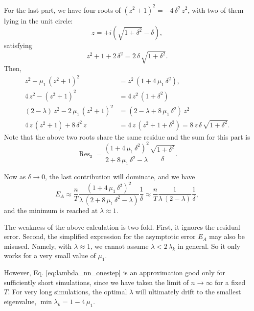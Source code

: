 \documentclass[reprint, floatfix]{revtex4-1}
\newcommand{\Err}{E}
\begin{document}
{For the last part,
we have four roots of
$(z^2 + 1)^2 = - 4 \, \delta^2 \, z^2$,
with two of them lying in the unit circle:
$$
z = \pm i \left( \sqrt{ 1 + \delta^2 } - \delta \right),
$$
satisfying
$$
z^2 + 1 + 2 \, \delta^2 = 2 \, \delta \, \sqrt{1 + \delta^2}.
$$
Then,
$$
\begin{aligned}
z^2 - \mu_1 \, \left( z^2 + 1 \right)^2
&= z^2 \, (1 + 4 \, \mu_1 \, \delta^2),
\\
4 \, z^2 - \left( z^2 + 1 \right)^2
&=
4 \, z^2 \, (1 + \delta^2)
\\
%
(2 - \lambda) \, z^2
- 2 \, \mu_1 \, \left( z^2 + 1 \right)^2
&=
\left(
  2 - \lambda + 8 \, \mu_1 \, \delta^2
\right) \, z^2
\\
%
4 \, z \, \left( z^2 + 1 \right)
+
8 \, \delta^2 \, z
&=
4 \, z \, (z^2 + 1 + \delta^2)
=
8 \, z \, \delta \, \sqrt{ 1 + \delta^2 }.
\end{aligned}
$$
Note that the above two roots share the same
residue and the sum for this part is
$$
\operatorname{Res}_3
=
\frac{ \left( 1 + 4 \, \mu_1 \, \delta^2 \right)^2 }
     {        2 + 8 \, \mu_1 \, \delta^2 - \lambda }
\frac{ \sqrt{ 1 + \delta^2 } }
     {        \delta         }.
$$

Now as $\delta \to 0$, the last contribution will dominate,
and we have
$$
\Err_A
\approx
\frac{ n } { T }
\frac{ (1 + 4 \, \mu_1 \, \delta^2)^2 }
{ \lambda \, (2 + 8 \, \mu_1 \, \delta^2 - \lambda) }
\frac{ 1 } { \delta }
\approx
\frac{ n } { T }
\frac{ 1 }
{ \lambda \, (2 - \lambda) }
\frac{ 1 } { \delta },
$$
and the minimum is reached at $\lambda \approx 1$.

The weakness of the above calculation is two fold.
%
First, it ignores the residual error.
%
Second, the simplified expression for the asymptotic error
$E_A$ may also be misused.
%
Namely, with $\lambda \approx 1$,
we cannot assume $\lambda < 2 \, \lambda_k$ in general.
%
So it only works for a very small value of $\mu_1$.
}



However, Eq. \eqref{eq:lambda_nn_onestep}
is an approximation good only
for sufficiently short simulations,
since we have taken the limit of $n \to \infty$
for a fixed $T$.
%
For very long simulations,
the optimal $\lambda$
will ultimately drift to
the smallest eigenvalue,
$\min \lambda_k = 1 - 4 \, \mu_1$.


\end{document}
